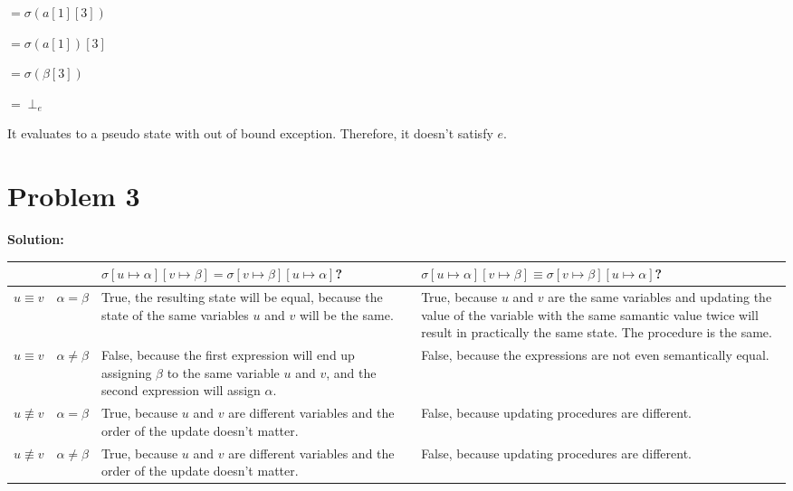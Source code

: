 \documentclass{article}
\begin{document}
\qquad \qquad \qquad \qquad \qquad \qquad \qquad \qquad \qquad \qquad $= \sigma(a[1][3])$

\qquad \qquad \qquad \qquad \qquad \qquad \qquad \qquad \qquad \qquad $= \sigma(a[1])[3]$

\qquad \qquad \qquad \qquad \qquad \qquad \qquad \qquad \qquad \qquad $= \sigma(\beta [3])$

\qquad \qquad \qquad \qquad \qquad \qquad \qquad \qquad \qquad \qquad $= \perp_e$

It evaluates to a pseudo state with out of bound exception. Therefore, it doesn't satisfy $e$.


\section*{Problem 3}
\textbf{Solution:}

\begin{center}
    \begin{tabular}{ | c | c | p{6.5cm} | p{6.5cm} | }
      \hline
       &  & $\sigma[u \mapsto \alpha][v \mapsto \beta] = \sigma [v \mapsto \beta][u \mapsto \alpha]$? & $\sigma[u \mapsto \alpha][v \mapsto \beta] \equiv \sigma [v \mapsto \beta][u \mapsto \alpha]$? \\ \hline
      $ u \equiv v $ & $ \alpha = \beta $ & True, the resulting state will be equal, because the state of the same variables $u$ and $v$ will be the same. & True, because $u$ and $v$ are the same variables and updating the value of the variable with the same samantic value twice will result in practically the same state. The procedure is the same.\\ \hline
      $ u \equiv v $ & $ \alpha \neq \beta $ & False, because the first expression will end up assigning $\beta$ to the same variable $u$ and $v$, and the second expression will assign $\alpha$. & False, because the expressions are not even semantically equal.\\ \hline
      $ u \not\equiv v $ & $ \alpha = \beta $ & True, because $u$ and $v$ are different variables and the order of the update doesn't matter. & False, because updating procedures are different. \\ \hline
      $ u \not\equiv v $ & $ \alpha \neq \beta $ & True, because $u$ and $v$ are different variables and the order of the update doesn't matter. & False, because updating procedures are different. \\
      \hline
    \end{tabular}
\end{center}
\end{document}
